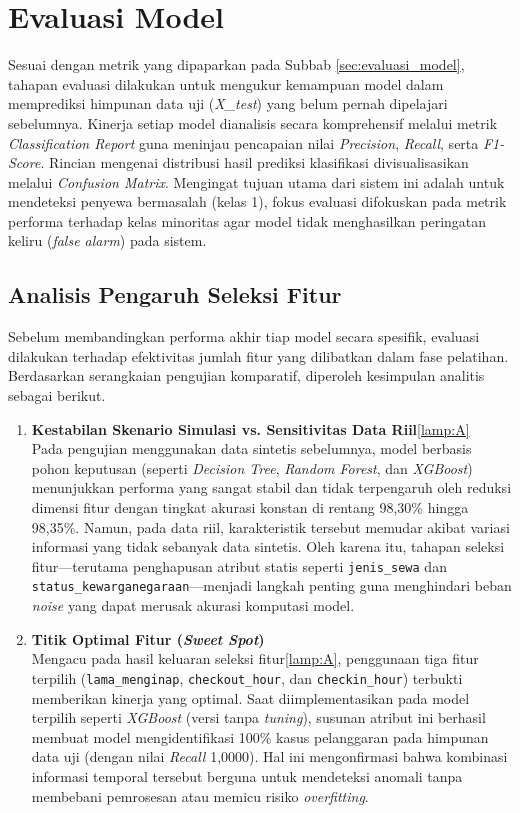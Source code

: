 \section{Evaluasi Model}

Sesuai dengan metrik yang dipaparkan pada Subbab \ref{sec:evaluasi_model}, tahapan evaluasi dilakukan untuk mengukur kemampuan model dalam memprediksi himpunan data uji (\textit{X\_test}) yang belum pernah dipelajari sebelumnya. Kinerja setiap model dianalisis secara komprehensif melalui metrik \textit{Classification Report} guna meninjau pencapaian nilai \textit{Precision}, \textit{Recall}, serta \textit{F1-Score}. Rincian mengenai distribusi hasil prediksi klasifikasi divisualisasikan melalui \textit{Confusion Matrix}. Mengingat tujuan utama dari sistem ini adalah untuk mendeteksi penyewa bermasalah (kelas 1), fokus evaluasi difokuskan pada metrik performa terhadap kelas minoritas agar model tidak menghasilkan peringatan keliru (\textit{false alarm}) pada sistem.

\subsection{Analisis Pengaruh Seleksi Fitur}
Sebelum membandingkan performa akhir tiap model secara spesifik, evaluasi dilakukan terhadap efektivitas jumlah fitur yang dilibatkan dalam fase pelatihan. Berdasarkan serangkaian pengujian komparatif, diperoleh kesimpulan analitis sebagai berikut.
\begin{enumerate}
    \item \textbf{Kestabilan Skenario Simulasi vs. Sensitivitas Data Riil}\ref{lamp:A}\\ Pada pengujian menggunakan data sintetis sebelumnya, model berbasis pohon keputusan (seperti \textit{Decision Tree}, \textit{Random Forest}, dan \textit{XGBoost}) menunjukkan performa yang sangat stabil dan tidak terpengaruh oleh reduksi dimensi fitur dengan tingkat akurasi konstan di rentang 98,30\% hingga 98,35\%. Namun, pada data riil, karakteristik tersebut memudar akibat variasi informasi yang tidak sebanyak data sintetis. Oleh karena itu, tahapan seleksi fitur—terutama penghapusan atribut statis seperti \texttt{jenis\_sewa} dan \texttt{status\_kewarganegaraan}—menjadi langkah penting guna menghindari beban \textit{noise} yang dapat merusak akurasi komputasi model.
    \item \textbf{Titik Optimal Fitur (\textit{Sweet Spot})}\\ Mengacu pada hasil keluaran seleksi fitur\ref{lamp:A}, penggunaan tiga fitur terpilih (\texttt{lama\_menginap}, \texttt{checkout\_hour}, dan \texttt{checkin\_hour}) terbukti memberikan kinerja yang optimal. Saat diimplementasikan pada model terpilih seperti \textit{XGBoost} (versi tanpa \textit{tuning}), susunan atribut ini berhasil membuat model mengidentifikasi 100\% kasus pelanggaran pada himpunan data uji (dengan nilai \textit{Recall} 1,0000). Hal ini mengonfirmasi bahwa kombinasi informasi temporal tersebut berguna untuk mendeteksi anomali tanpa membebani pemrosesan atau memicu risiko \textit{overfitting}.
\end{enumerate}

